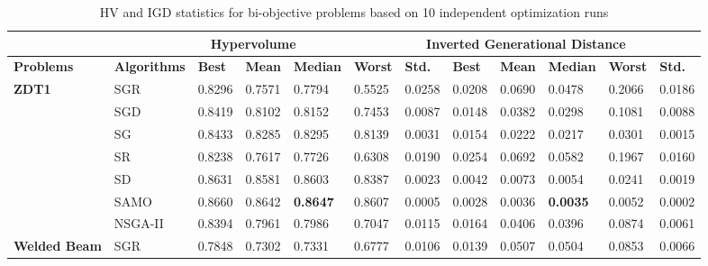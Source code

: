 \begin{table*}[!htb]\scriptsize
	\centering
	\caption{HV and IGD statistics for bi-objective problems based on 10 independent optimization runs}
	\begin{tabular}{|l|l|l|l|l|l|l|l|l|l|l|l|}
		\noalign{\smallskip}\hline
		\multicolumn{2}{|c|}{} & \multicolumn{5}{|c|}{\textbf{Hypervolume}} & \multicolumn{5}{|c|}{\textbf{Inverted Generational Distance}}\\ \hline
		\textbf{Problems}            & \textbf{Algorithms} & \textbf{Best} & \textbf{Mean} & \textbf{Median} & \textbf{Worst} & \textbf{Std.} & \textbf{Best} & \textbf{Mean} & \textbf{Median} & \textbf{Worst} & \textbf{Std.}\\ \hline
		\multirow{7}{*}{\textbf{ZDT1}}                    & SGR                 & 0.8296         & 0.7571         & 0.7794           & 0.5525          & 0.0258              & 0.0208         & 0.0690         & 0.0478           & 0.2066          & 0.0186              \\ 
		& SGD                 & 0.8419         & 0.8102         & 0.8152           & 0.7453          & 0.0087   & 0.0148         & 0.0382         & 0.0298           & 0.1081          & 0.0088                    \\ 
		& SG                  & 0.8433         & 0.8285         & 0.8295           & 0.8139          & 0.0031     & 0.0154         & 0.0222         & 0.0217           & 0.0301          & 0.0015                       \\ 
		& SR                  & 0.8238         & 0.7617         & 0.7726           & 0.6308          & 0.0190    & 0.0254         & 0.0692         & 0.0582           & 0.1967          & 0.0160                    \\ 
		& SD                  & 0.8631         & 0.8581         & 0.8603           & 0.8387          & 0.0023       & 0.0042         & 0.0073         & 0.0054           & 0.0241          & 0.0019                   \\ 
		& SAMO                & 0.8660         & 0.8642         & \textbf{0.8647}           & 0.8607          & 0.0005& 0.0028         & 0.0036         & \textbf{0.0035}           & 0.0052          & 0.0002              \\ 
		& NSGA-II             & 0.8394         & 0.7961         & 0.7986           & 0.7047          & 0.0115     & 0.0164         & 0.0406         & 0.0396           & 0.0874          & 0.0061                    \\ \hline
		\multirow{7}{*}{\textbf{Welded Beam}}                    & SGR                 & 0.7848         & 0.7302         & 0.7331           & 0.6777          & 0.0106 & 0.0139         & 0.0507         & 0.0504           & 0.0853          & 0.0066  \\          

\end{tabular}
\end{table*}
